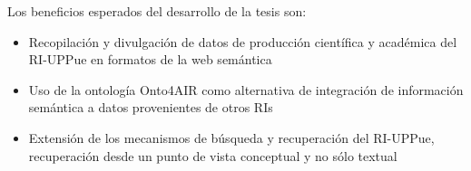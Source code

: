 Los beneficios esperados del desarrollo de la tesis son:
	
	\begin{itemize}
	 \item Recopilaci\'on y divulgaci\'on de datos de producci\'on cient\'ifica y acad\'emica del RI-UPPue en formatos de la web sem\'antica    
         \item Uso de la ontolog\'ia Onto4AIR como alternativa de integraci\'on de informaci\'on sem\'antica a datos provenientes de otros RIs
         \item Extensi\'on de los mecanismos de b\'usqueda y recuperaci\'on del RI-UPPue, recuperaci\'on desde un punto de vista conceptual y no s\'olo textual 
         \end{itemize}

